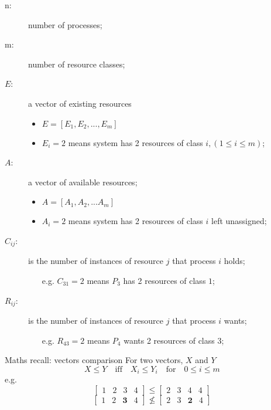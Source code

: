 \begin{description}
\item[n:] number of processes;
\item[m:] number of resource classes;
\item[$E$:] a vector of existing resources
  \begin{itemize}
  \item $E=[E_1,E_2,...,E_m]$
  \item $E_i=2$ means system has 2 resources of class $i, (1\le{}i\le{}m)$;
  \end{itemize}
\item[$A$:] a vector of available resources;
  \begin{itemize}
  \item $A=[A_1,A_2,...A_m]$
  \item $A_i=2$ means system has 2 resources of class $i$ left unassigned;
  \end{itemize}
\item[$C_{ij}$:] is the number of instances of resource $j$ that process $i$ holds;
  \begin{itemize}
  \item[e.g.] $C_{31}=2$ means $P_3$ has 2 resources of class $1$;
  \end{itemize}
\item[$R_{ij}$:] is the number of instances of resource $j$ that process $i$ wants;
  \begin{itemize}
  \item[e.g.] $R_{43}=2$ means $P_4$ wants 2 resources of class $3$;
  \end{itemize}
\end{description}

\begin{frame}%
  \begin{block}{Maths recall: vectors comparison}
    For two vectors, $X$ and $Y$
    $$X\le{}Y \quad \text{iff} \quad X_i\le{}Y_i \quad \text{for} \quad 0\le{}i\le{}m$$
    e.g.
    $$ \begin{bmatrix} 1 & 2 & 3 & 4 \end{bmatrix}
    \le{}
    \begin{bmatrix} 2 & 3 & 4 & 4 \end{bmatrix} $$
    $$ \begin{bmatrix} 1 & 2 & \mathbf{3} & 4 \end{bmatrix}
    \nleq{}
    \begin{bmatrix} 2 & 3 & \mathbf{2} & 4 \end{bmatrix} $$
  \end{block}
\end{frame}

